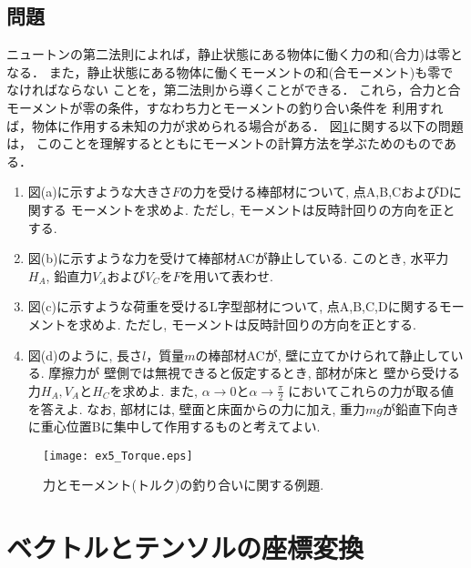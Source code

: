 \documentclass[10pt,a4j]{jbook}
\begin{document}
\subsection{問題}
ニュートンの第二法則によれば，静止状態にある物体に働く力の和(合力)は零となる．
また，静止状態にある物体に働くモーメントの和(合モーメント)も零でなければならない
ことを，第二法則から導くことができる．
これら，合力と合モーメントが零の条件，すなわち力とモーメントの釣り合い条件を
利用すれば，物体に作用する未知の力が求められる場合がある．
図\ref{fig:ex5_Torque}に関する以下の問題は，
このことを理解するとともにモーメントの計算方法を学ぶためのものである．
\begin{enumerate}
\item
図(a)に示すような大きさ$F$の力を受ける棒部材について, 点A,B,CおよびDに関する
モーメントを求めよ. ただし, モーメントは反時計回りの方向を正とする. 
\item
図(b)に示すような力を受けて棒部材ACが静止している. このとき, 水平力$H_A$, 
鉛直力$V_A$および$V_C$を$F$を用いて表わせ. 
\item
図(c)に示すような荷重を受けるL字型部材について, 点A,B,C,Dに関するモーメントを求めよ. 
ただし, モーメントは反時計回りの方向を正とする. 
\item
図(d)のように, 長さ$l$，質量$m$の棒部材ACが, 壁に立てかけられて静止している. 
摩擦力が 壁側では無視できると仮定するとき, 部材が床と
壁から受ける力$H_A, V_A$と$H_C$を求めよ. また, $\alpha\rightarrow 0$と$\alpha \rightarrow \frac{\pi}{2}$
においてこれらの力が取る値を答えよ. なお, 部材には, 壁面と床面からの力に加え, 
重力$mg$が鉛直下向きに重心位置Bに集中して作用するものと考えてよい. 
\end{enumerate}
\begin{figure}[h]
	\begin{center}
	\texttt{[image: ex5\_Torque.eps]} 
	\end{center}
	\caption{力とモーメント(トルク)の釣り合いに関する例題.} 
	\label{fig:ex5_Torque}
\end{figure}
\section{ベクトルとテンソルの座標変換}
\end{document}
